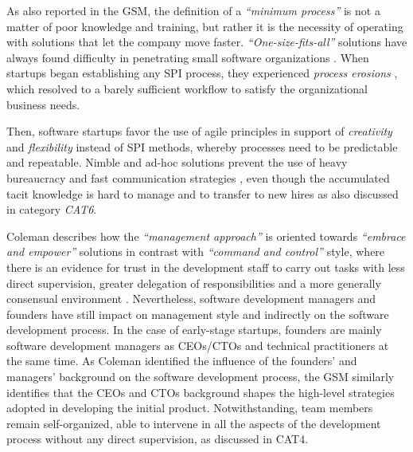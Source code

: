 \documentclass[10pt,journal,letterpaper,compsoc]{IEEEtran}
\begin{document}
As also reported in the GSM, the definition of a \textit{``minimum process''} 
is not a matter of poor knowledge and training, but rather it is the necessity 
of operating with solutions that let the company move faster. 
\textit{``One-size-fits-all''} solutions have always found difficulty in 
penetrating small software organizations \cite{Staples2007}. When startups began 
establishing any SPI process, they experienced \textit{process erosions} %
, which resolved to a barely sufficient workflow to satisfy the organizational 
business needs.

Then, software startups favor the use of agile principles in support of 
\textit{creativity} and \textit{flexibility} instead of SPI methods, whereby 
processes need to be predictable and repeatable. Nimble and ad-hoc solutions 
prevent the use of heavy bureaucracy and fast communication strategies %
, even though the accumulated tacit knowledge is hard to manage and to transfer 
to new hires as also discussed in category \textit{CAT6}.

Coleman describes how the \textit{``management approach''} is oriented towards 
\textit{``embrace and empower''} solutions in contrast with \textit{``command 
and control''} style, where there is an evidence for trust in the  development 
staff to carry out tasks with less direct supervision, greater delegation of 
responsibilities and a more generally consensual environment \cite{Coleman2008}. 
Nevertheless, software development managers and founders have still impact on 
management style and indirectly on the software development process. In the case 
of early-stage startups, founders are mainly software development managers as 
CEOs/CTOs and  technical practitioners at the same time. As Coleman identified 
the influence of the founders' and managers' background on the software 
development process, the GSM similarly identifies that the CEOs and CTOs 
background shapes the high-level strategies adopted in developing the initial 
product. Notwithstanding, team members remain self-organized, able to intervene 
in all the aspects of the development process without any direct supervision, as 
discussed in CAT4.
\end{document}
